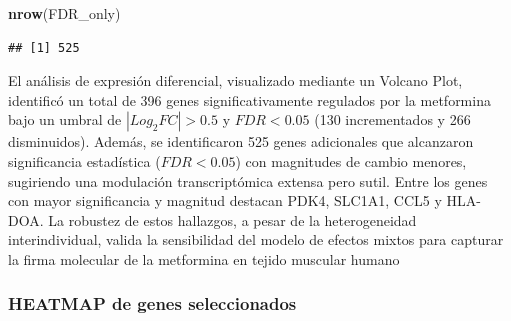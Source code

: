 \documentclass[
  spanish,
  11pt,
]{article}
\newenvironment{Shaded}{\begin{snugshade}}{\end{snugshade}}
\newcommand{\FunctionTok}[1]{\textcolor[rgb]{0.13,0.29,0.53}{\textbf{#1}}}
\newcommand{\NormalTok}[1]{#1}
\begin{document}
\begin{Shaded}
\begin{Highlighting}[]
\FunctionTok{nrow}\NormalTok{(FDR\_only)}
\end{Highlighting}
\end{Shaded}

\begin{verbatim}
## [1] 525
\end{verbatim}

El análisis de expresión diferencial, visualizado mediante un Volcano
Plot, identificó un total de 396 genes significativamente regulados por
la metformina bajo un umbral de \(|Log_2FC| > 0.5\) y \(FDR < 0.05\)
(130 incrementados y 266 disminuidos). Además, se identificaron 525
genes adicionales que alcanzaron significancia estadística
(\(FDR < 0.05\)) con magnitudes de cambio menores, sugiriendo una
modulación transcriptómica extensa pero sutil. Entre los genes con mayor
significancia y magnitud destacan PDK4, SLC1A1, CCL5 y HLA-DOA. La
robustez de estos hallazgos, a pesar de la heterogeneidad
interindividual, valida la sensibilidad del modelo de efectos mixtos
para capturar la firma molecular de la metformina en tejido muscular
humano

\subsubsection{HEATMAP de genes
seleccionados}\label{heatmap-de-genes-seleccionados}

\newpage
\end{document}

